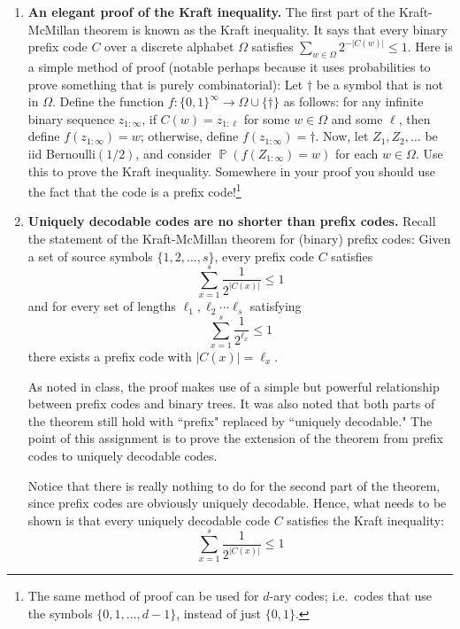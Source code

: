 \documentclass[11pt]{report}
\DeclareMathOperator{\Prob}{\mathbb{P}}
\begin{document}
\begin{enumerate}[1.]
          \pagebreak

    \item {\bf An elegant proof of the Kraft inequality.} The first part of the Kraft-McMillan theorem is known as the Kraft inequality. It says that every binary prefix code $C$ over a discrete alphabet $\Omega$ satisfies $\sum_{w\in\Omega} 2^{-|C(w)|} \leq 1$. Here is a simple method of proof (notable perhaps because it uses probabilities to prove something that is purely combinatorial): Let $\dagger$ be a symbol that is not in $\Omega$. Define the function $f:\{0,1\}^\infty\to\Omega\cup\{\dagger\}$ as follows: for any infinite binary sequence $z_{1:\infty}$, if $C(w)=z_{1:\ell}$ for some $w\in\Omega$ and some $\ell$, then define $f(z_{1:\infty})=w$; otherwise, define $f(z_{1:\infty})=\dagger$. Now, let $Z_1,Z_2,\dots$ be iid Bernoulli$(1/2)$, and consider $\Prob(f(Z_{1:\infty})=w)$ for each $w\in\Omega$. Use this to prove the Kraft inequality. Somewhere in your proof you should use the fact that the code is a prefix code!\footnote{The same method of proof can be used for $d$-ary codes; i.e.~codes that use the symbols $\{0,1,\dotsc,d-1\}$, instead of just $\{0,1\}$.}




          \pagebreak


    \item \label{HW:Uniquely} {\bf Uniquely decodable codes are no shorter than prefix codes.} Recall the statement of the Kraft-McMillan theorem for (binary) prefix codes: Given a set of source symbols $\{1,2,\ldots,s\}$,
          every prefix code $C$ satisfies
          \[
              \sum_{x=1}^{s}\frac{1}{2^{\left|C(x)\right|}}\leq1
          \]
          and for every set of lengths $\ell_{1},\ell_{2}\cdots\ell_{s}$ satisfying
          \[
              \sum_{x=1}^{s}\frac{1}{2^{\ell_{x}}}\leq1
          \]
          there exists a prefix code with $\left|C(x)\right|=\ell_{x}$.

          As noted in class, the proof makes use of a simple but powerful relationship between prefix codes and binary trees. It was also noted that both parts of the theorem still hold with ``prefix" replaced by ``uniquely decodable."
          The point of this assignment is to prove the extension of the theorem from prefix codes to uniquely decodable codes.

          Notice that there is really nothing to do for the second part of the theorem,
          since prefix codes are obviously uniquely decodable. Hence, what needs to be shown is that every uniquely decodable code $C$ satisfies the Kraft inequality:
          \begin{equation}
              \label{eqn:Kraft}
              \sum_{x=1}^{s}\frac{1}{2^{\left|C(x)\right|}}\leq1
          \end{equation}


\end{enumerate}
\end{document}
